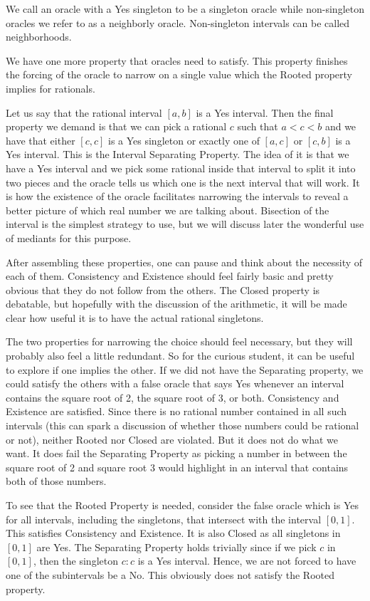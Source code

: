 \documentclass[12pt]{article}
\begin{document}
We call an oracle with a Yes singleton to be a singleton oracle while non-singleton oracles we refer to as a neighborly oracle. Non-singleton intervals can be called neighborhoods. 

We have one more property that oracles need to satisfy. This property finishes the forcing of the oracle to narrow on a single value which the Rooted property implies for rationals. 

Let us say that the rational interval $[a, b]$ is a Yes interval. Then the final property we demand is that we can pick a rational $c$ such that $a < c <b$ and we have that either $[c,c]$ is a Yes singleton or exactly one of $[a,c]$ or $[c,b]$ is a Yes interval. This is the Interval Separating Property. The idea of it is that we have a Yes interval and we pick some rational inside that interval to split it into two pieces and the oracle tells us which one is the next interval that will work. It is how the existence of the oracle facilitates narrowing the intervals to reveal a better picture of which real number we are talking about. Bisection of the interval is the simplest strategy to use, but we will discuss later the wonderful use of mediants for this purpose. 

After assembling these properties, one can pause and think about the necessity of each of them. Consistency and Existence should feel fairly basic and pretty obvious that they do not follow from the others. The Closed property is debatable, but hopefully with the discussion of the arithmetic, it will be made clear how useful it is to have the actual rational singletons.  

The two properties for narrowing the choice should feel necessary, but they will probably also feel a little redundant. So for the curious student, it can be useful to explore if one implies the other. If we did not have the Separating property, we could satisfy the others with a false oracle that says Yes whenever an interval contains the square root of 2, the square root of 3, or both. Consistency and Existence are satisfied. Since there is no rational number contained in all such intervals (this can spark a discussion of whether those numbers could be rational or not), neither Rooted nor Closed are violated. But it does not do what we want. It does fail the Separating Property as picking a number in between the square root of 2 and square root 3 would highlight in an interval that contains both of those numbers.  

To see that the Rooted Property is needed, consider the false oracle which is Yes for all intervals, including the singletons, that intersect with the interval $[0,1]$. This satisfies Consistency and Existence. It is also Closed as all singletons in $[0,1]$ are Yes. The Separating Property holds trivially since if we pick $c$ in $[0,1]$, then the singleton $c:c$ is a Yes interval. Hence, we are not forced to have one of the subintervals be a No. This obviously does not satisfy the Rooted property. 
\end{document}
